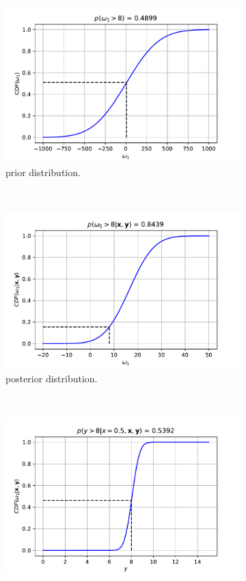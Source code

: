 \documentclass{article}
\begin{document}
\begin{figure}[htb!]
     \centering
     \begin{subfigure}[b]{0.3\textwidth}
         \centering
         \includegraphics[width=\textwidth]{Q2_9.pdf}
         \caption{prior distribution.}
     \end{subfigure}
     ~
     \begin{subfigure}[b]{0.3\textwidth}
         \centering
         \includegraphics[width=\textwidth]{Q2_10.pdf}
         \caption{posterior distribution.}
     \end{subfigure}
     ~
     \begin{subfigure}[b]{0.3\textwidth}
         \centering
         \includegraphics[width=\textwidth]{Q2_11.pdf}

\end{subfigure}
\end{figure}
\end{document}
